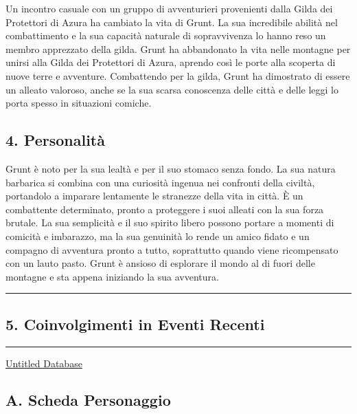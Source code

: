 Un incontro casuale con un gruppo di avventurieri provenienti dalla
Gilda dei Protettori di Azura ha cambiato la vita di Grunt. La sua
incredibile abilità nel combattimento e la sua capacità naturale di
sopravvivenza lo hanno reso un membro apprezzato della gilda. Grunt ha
abbandonato la vita nelle montagne per unirsi alla Gilda dei Protettori
di Azura, aprendo così le porte alla scoperta di nuove terre e
avventure. Combattendo per la gilda, Grunt ha dimostrato di essere un
alleato valoroso, anche se la sua scarsa conoscenza delle città e delle
leggi lo porta spesso in situazioni comiche.

\subsection{4. Personalità}\label{personalituxe0}

Grunt è noto per la sua lealtà e per il suo stomaco senza fondo. La sua
natura barbarica si combina con una curiosità ingenua nei confronti
della civiltà, portandolo a imparare lentamente le stranezze della vita
in città. È un combattente determinato, pronto a proteggere i suoi
alleati con la sua forza brutale. La sua semplicità e il suo spirito
libero possono portare a momenti di comicità e imbarazzo, ma la sua
genuinità lo rende un amico fidato e un compagno di avventura pronto a
tutto, soprattutto quando viene ricompensato con un lauto pasto. Grunt è
ansioso di esplorare il mondo al di fuori delle montagne e sta appena
iniziando la sua avventura.

\begin{center}\rule{0.5\linewidth}{0.5pt}\end{center}

\subsection{5. Coinvolgimenti in Eventi
Recenti}\label{coinvolgimenti-in-eventi-recenti}

\begin{center}\rule{0.5\linewidth}{0.5pt}\end{center}

\href{Untitled\%20Database\%203abb1ead1dea450c8b5bf8e09d4ba432.csv}{Untitled
Database}

\subsection{A. Scheda Personaggio}\label{a.-scheda-personaggio}

